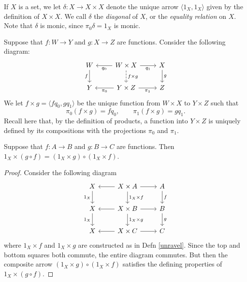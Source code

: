 

\newcommand{\dl}{\delta}

\begin{defn} If $X$ is a set, we let $\dl :X\to X\times X$ denote the
  unique arrow $\langle 1_X,1_X\rangle$ given by the definition of
  $X\times X$.  We call $\dl$ the \emph{diagonal} of $X$, or the
  \emph{equality relation} on $X$.  Note that $\dl$ is monic, since
  $\pi _0\dl =1_X$ is monic.  \end{defn}

\begin{defn} Suppose that $f:W\to Y$ and $g:X\to Z$ are functions.
  Consider the following diagram:
\[ \begin{tikzcd}
W \arrow[d,"f"'] & W\times X \arrow[l,"q_0"] \arrow[r,"q_1"']
\arrow[dashed,d,"f\times g"] & X
\arrow[d,"g"] \\
Y               & Y\times Z \arrow[l,"\pi _0"] \arrow[r,"\pi _1"'] & Z 
\end{tikzcd} \]
We let $f\times g=\langle fq_0,gq_1\rangle$ be the unique
function from $W\times X$ to $Y\times Z$ such that 
\[ \pi _0(f\times g) = fq_0,\qquad \pi _1(f\times g)=gq_1 .\] Recall
here that, by the definition of products, a function into $Y\times Z$
is uniquely defined by its compositions with the projections $\pi _0$
and $\pi _1$.
\label{unravel} \end{defn}

\begin{prop} Suppose that $f:A\to B$ and $g:B\to C$ are functions.
  Then $1_X\times (g\circ f)=(1_X\times g)\circ (1_X\times
  f)$. \end{prop}

\begin{proof} Consider the following diagram
\[ \begin{tikzcd} 
X \arrow[d,"1_X"'] &   X\times A \arrow[l] \arrow[r] \arrow[d,"1_X\times f"]
& A \arrow[d,"f"]  \\
X \arrow[d,"1_X"'] &   X\times B \arrow[l] \arrow[r] \arrow[d,"1_X\times g"]
& B \arrow[d,"g"] \\
X   &   X\times C \arrow[l] \arrow[r] & C 
\end{tikzcd} \] where $1_X\times f$ and $1_X\times g$ are constructed
as in Defn \ref{unravel}.  Since the top and bottom squares both
commute, the entire diagram commutes.  But then the composite arrow
$(1_X\times g)\circ (1_X\times f)$ satisfies the defining properties
of $1_X\times (g\circ f)$. \end{proof}

